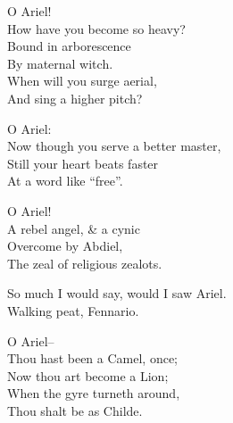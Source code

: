 
\secdiv

O Ariel! \\
How have you become so heavy? \\ 
Bound in arborescence \\
By maternal witch. \\
When will you surge aerial, \\
And sing a higher pitch? 

O Ariel: \\
Now though you serve a better master, \\
Still your heart beats faster \\
At a word like ``free''.

O Ariel! \\
A rebel angel, \& a cynic \\
Overcome by Abdiel, \\
The zeal of religious zealots.

So much I would say, would I saw Ariel. \\
Walking peat, Fennario. %

O Ariel-- \\
Thou hast been a Camel, once; \\
Now thou art become a Lion; \\
When the gyre turneth around, \\
Thou shalt be as Childe.